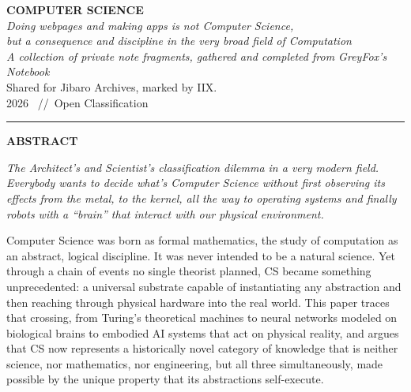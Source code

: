 \documentclass[11pt,a4paper]{article}
\begin{document}
\begin{center}
{\LARGE\bfseries COMPUTER SCIENCE}\\[1.0em]
{\itshape\large Doing webpages and making apps is not Computer Science,\\
but a consequence and discipline in the very broad field of Computation}\\[1.2em]
{\itshape A collection of private note fragments, gathered and completed from GreyFox's Notebook}\\[0.3em]
Shared for Jibaro Archives, marked by IIX.\\[0.2em]
{\small\color{gray!60!black} 2026 \ //\ Open Classification}
\end{center}

\vspace{0.5em}
\noindent\rule{\textwidth}{0.4pt}
\vspace{0.4em}

\begin{center}
\textbf{\large ABSTRACT}
\end{center}

\textit{The Architect's and Scientist's classification dilemma in a very modern field. Everybody wants to decide what's Computer Science without first observing its effects from the metal, to the kernel, all the way to operating systems and finally robots with a ``brain'' that interact with our physical environment.}

Computer Science was born as formal mathematics, the study of computation as an abstract, logical discipline. It was never intended to be a natural science. Yet through a chain of events no single theorist planned, CS became something unprecedented: a universal substrate capable of instantiating any abstraction and then reaching through physical hardware into the real world. This paper traces that crossing, from Turing's theoretical machines to neural networks modeled on biological brains to embodied AI systems that act on physical reality, and argues that CS now represents a historically novel category of knowledge that is neither science, nor mathematics, nor engineering, but all three simultaneously, made possible by the unique property that its abstractions self-execute.
\end{document}
